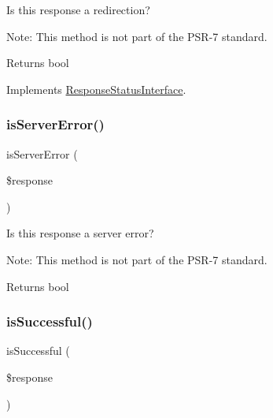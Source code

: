 Is this response a redirection?

Note\+: This method is not part of the P\+S\+R-\/7 standard.

\begin{DoxyReturn}{Returns}
bool 
\end{DoxyReturn}


Implements \mbox{\hyperlink{interface_pes_1_1_http_1_1_response_status_interface_a5b211efda150fe422f2ae707392168d6}{Response\+Status\+Interface}}.

\mbox{\label{class_pes_1_1_http_1_1_response_status_a231e10c5923247f27d4ce5ba6aaa7a97}} 
\subsubsection{\texorpdfstring{is\+Server\+Error()}{isServerError()}}
{\footnotesize\ttfamily is\+Server\+Error (\begin{DoxyParamCaption}\item[{Response\+Interface}]{\$response }\end{DoxyParamCaption})}

Is this response a server error?

Note\+: This method is not part of the P\+S\+R-\/7 standard.

\begin{DoxyReturn}{Returns}
bool 
\end{DoxyReturn}
\mbox{\label{class_pes_1_1_http_1_1_response_status_ac9309d8cf733cca95b953596caeb3969}} 
\subsubsection{\texorpdfstring{is\+Successful()}{isSuccessful()}}
{\footnotesize\ttfamily is\+Successful (\begin{DoxyParamCaption}\item[{Response\+Interface}]{\$response }\end{DoxyParamCaption})}

